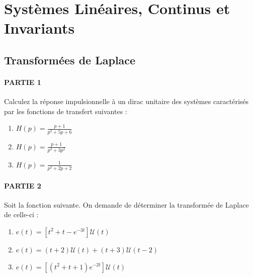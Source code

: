 \chapter{Systèmes Linéaires, Continus et Invariants}
\thispagestyle{plain} %
\newpage


\section{Transformées de Laplace}



\subsubsection{PARTIE 1}
Calculez la r\'eponse impulsionnelle \`a un dirac unitaire des syst\`emes caract\'eris\'es par les fonctions de transfert suivantes :

\begin{enumerate}
\item \(H(p) = \frac{p+1}{p^2+5p+6}\)
\item \(H(p) =\frac{p+1}{p^3+3p^2}\)
\item \(H(p) =\frac{1}{p^2+2p+2}\)
\end{enumerate}

\subsubsection{PARTIE 2}
Soit la fonction suivante. On demande de d\'eterminer la transform\'ee de Laplace
de celle-ci :
\begin{enumerate}
\item \(e(t) = [t^2+t-e^{-3t}]\mathcal{U}(t)\)
\item \(e(t) = (t+2)\mathcal{U}(t)+(t+3)\mathcal{U}(t-2)\)
\item \(e(t) = [(t^2+t+1)e^{-2t}]\mathcal{U}(t)\)
\end{enumerate}

